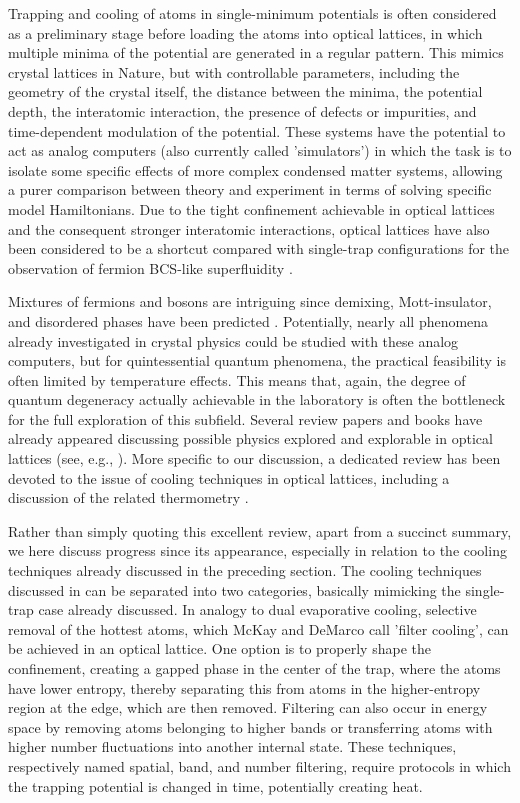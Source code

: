 \documentclass[pra,letterpaper,twocolumn,showpacs,superscriptaddress]{revtex4}
\begin{document}
Trapping and cooling of atoms in single-minimum potentials is often considered as a preliminary stage before loading the atoms into optical lattices, in which 
multiple minima of the potential are generated in a regular pattern. This mimics crystal lattices in Nature, but with controllable 
parameters, including the geometry of the crystal itself, the distance between the minima, the potential depth, the interatomic interaction, the 
presence of defects or impurities, and time-dependent modulation of the potential. 
These systems have the potential to act as analog computers (also currently called 'simulators') in which the task is to isolate some specific effects of 
more complex condensed matter systems, allowing a purer comparison between theory and experiment in terms of solving specific model Hamiltonians.
Due to the tight confinement achievable in optical lattices and the consequent stronger interatomic interactions, optical lattices have also been  
considered to be a shortcut compared with single-trap configurations for the observation of fermion BCS-like superfluidity \cite{Hofstetter2002}.

Mixtures of fermions and bosons are intriguing since demixing, Mott-insulator, and disordered phases have been predicted \cite{Albus2003}.
Potentially, nearly all phenomena already investigated in crystal physics could be studied with these analog computers, but for quintessential quantum 
phenomena, the practical feasibility is often limited by temperature effects. This means that, again, the degree of quantum degeneracy actually achievable 
in the laboratory is often the bottleneck for the full exploration of this subfield. Several review papers and books have already  appeared discussing possible 
physics explored and explorable in optical lattices (see, e.g., \cite{Bloch2008,Lewenstein2012}). More specific to our discussion, a dedicated 
review has been devoted to the issue of cooling techniques in optical lattices, including a discussion of the related thermometry \cite{McKayRev2011}.

Rather than simply quoting this excellent review, apart from a succinct summary, we here discuss progress since 
its appearance, especially in relation to the cooling techniques already discussed in the preceding section. The cooling techniques discussed in 
\cite{McKayRev2011} can be separated into two categories, basically mimicking the single-trap case already discussed. In analogy to dual 
evaporative cooling, selective removal of the hottest atoms, which McKay and DeMarco call 'filter cooling', can be achieved in an optical lattice. 
One option is to properly shape the confinement, creating a gapped phase in the center of the trap, where the atoms have lower entropy, thereby separating 
this from atoms in the higher-entropy region at the edge, which are then removed. Filtering can also occur in energy space by removing atoms belonging to higher bands 
or transferring atoms with higher number fluctuations into another internal state. These techniques, respectively named spatial, band, and number filtering, 
require protocols in which the trapping potential is changed in time, potentially creating heat. 
\end{document}
